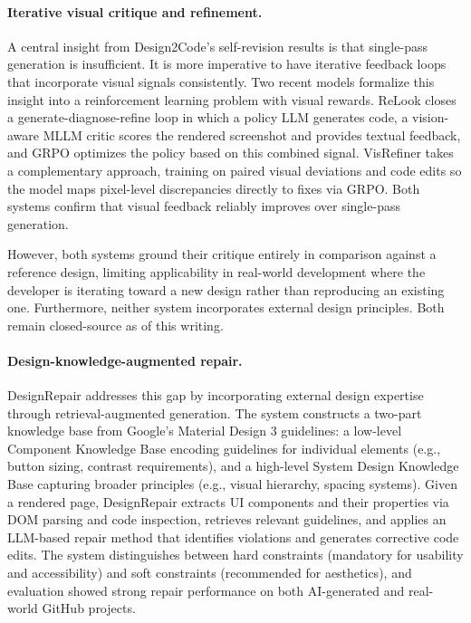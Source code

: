 \documentclass[11pt]{article}
\begin{document}
\paragraph{Iterative visual critique and refinement.} A central insight from Design2Code's self-revision results is that single-pass generation is insufficient. It is more imperative to have iterative feedback loops that incorporate visual signals consistently. Two recent models formalize this insight into a reinforcement learning problem with visual rewards. ReLook \cite{relook2025} closes a generate-diagnose-refine loop in which a policy LLM generates code, a vision-aware MLLM critic scores the rendered screenshot and provides textual feedback, and GRPO optimizes the policy based on this combined signal. VisRefiner \cite{visrefiner2026} takes a complementary approach, training on paired visual deviations and code edits so the model maps pixel-level discrepancies directly to fixes via GRPO. Both systems confirm that visual feedback reliably improves over single-pass generation.

However, both systems ground their critique entirely in comparison against a reference design, limiting applicability in real-world development where the developer is iterating toward a new design rather than reproducing an existing one. Furthermore, neither system incorporates external design principles. Both remain closed-source as of this writing.

\paragraph{Design-knowledge-augmented repair.} DesignRepair \cite{designrepair2024} addresses this gap by incorporating external design expertise through retrieval-augmented generation. The system constructs a two-part knowledge base from Google's Material Design 3 guidelines: a low-level Component Knowledge Base encoding guidelines for individual elements (e.g., button sizing, contrast requirements), and a high-level System Design Knowledge Base capturing broader principles (e.g., visual hierarchy, spacing systems). Given a rendered page, DesignRepair extracts UI components and their properties via DOM parsing and code inspection, retrieves relevant guidelines, and applies an LLM-based repair method that identifies violations and generates corrective code edits. The system distinguishes between hard constraints (mandatory for usability and accessibility) and soft constraints (recommended for aesthetics), and evaluation showed strong repair performance on both AI-generated and real-world GitHub projects.
\end{document}
